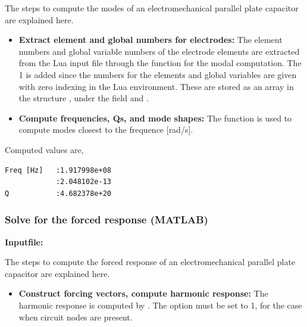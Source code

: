 \clearpage
The steps to compute the modes of an electromechanical
parallel plate capacitor are 
explained here. 

\begin{itemize}

  \item{\textbf{Extract element and global numbers for electrodes:}}
  The element numbers and global variable numbers of the electrode
  elements are extracted from the Lua input file through the function
   for the modal computation. The 1 is added
  since the numbers for the elements and global variables are given
  with zero indexing in the Lua environment. These are stored as an
  array in the structure , under the field  and
  . 

  \item{\textbf{Compute frequencies, Qs, and mode shapes:}}
  The function  is used to compute 
  modes closest to the frequence [rad/s]. 

\end{itemize}

Computed values are,
\begin{verbatim}
Freq [Hz]   :1.917998e+08
            :2.048102e-13
Q           :4.682378e+20
\end{verbatim}

\clearpage
\subsubsection*{Solve for the forced response (MATLAB)}
\begin{flushleft}
  \textbf{Inputfile:}
  \\
\end{flushleft}
\hspace{1in}
{\footnotesize
{}
}

\clearpage
The steps to compute the forced response of an electromechanical
parallel plate capacitor are 
explained here. 

\begin{itemize}

  \item{\textbf{Construct forcing vectors, compute harmonic response:}}
  The harmonic response is computed by . The
  option  must be set to 1, for the case when circuit nodes
  are present. 

\end{itemize}


